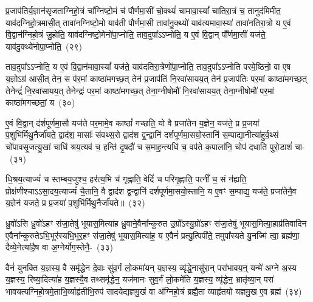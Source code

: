 {\anuvakamend[{वै मनः॒ स्फ्य इति॑ युन॒क्त्वेका॑\-दश च}]}

प्र॒जा\-प॑तिर्य॒ज्ञान॑सृजता\-ग्निहो॒त्रं चा᳚ग्निष्टो॒मं च॑ पौर्णमा॒सीं चो॒क्थ्यं॑ चामावा॒स्यां᳚ चातिरा॒त्रं च॒ तानुद॑मिमीत॒ याव॑दग्निहो॒त्रमासी॒त् तावा॑नग्निष्टो॒मो याव॑ती पौर्णमा॒सी तावा॑नु॒क्थ्यो॑ याव॑त्यमावा॒स्या॑ तावा॑नतिरा॒त्रो य ए॒वं वि॒द्वान॑ग्निहो॒त्रं जु॒होति॒ याव॑दग्निष्टो॒मेनो॑पा॒प्नोति॒ ताव॒दुपा᳚\-ऽऽ\-प्नोति॒ य ए॒वं वि॒द्वान् पौ᳚र्णमा॒सीं यज॑ते॒ याव॑दु॒क्थ्ये॑नो\-पा॒प्नोति॒~(२९)\ip

ताव॒दुपा᳚\-ऽऽ\-प्नोति॒ य ए॒वं वि॒द्वान॑मावा॒स्यां᳚ यज॑ते॒ याव॑दतिरा॒त्रेणो॑पा॒प्नोति॒ ताव॒दुपा᳚\-ऽऽ\-प्नोति परमे॒ष्ठिनो॒ वा ए॒ष य॒ज्ञो\-ऽग्र॑ आसी॒त् तेन॒ स प॑र॒मां काष्ठा॑मगच्छ॒त् तेन॑ प्र॒जा\-प॑तिं नि॒रवा॑सायय॒त् तेन॑ प्र॒जा\-प॑तिः पर॒मां काष्ठा॑मगच्छ॒त् तेनेन्द्रं॑ नि॒रवा॑सायय॒त् तेनेन्द्रः॑ पर॒मां काष्ठा॑मगच्छ॒त् तेना॒ग्नी\-षोमौ॑ नि॒रवा॑सायय॒त् तेना॒ग्नी\-षोमौ॑ पर॒मां काष्ठा॑मगच्छतां॒ य~(३०)\ip

ए॒वं वि॒द्वान् द॑र्\mbox{}शपूर्णमा॒सौ यज॑ते पर॒मामे॒व काष्ठां᳚ गच्छति॒ यो वै प्रजा॑तेन य॒ज्ञेन॒ यज॑ते॒ प्र प्र॒जया॑ प॒शुभि॑र्मिथु॒नैर्जा॑यते॒ द्वाद॑श॒ मासाः᳚ संवथ्स॒रो द्वाद॑श द्व॒न्द्वानि॑ दर्\mbox{}श\-पूर्ण\-मा॒सयो॒स्तानि॑ स॒म्पाद्या॒नीत्या॑हुर्व॒थ्सं चो॑पावसृ॒जत्यु॒खां चाधि॑ श्रय॒त्यव॑ च॒ हन्ति॑ दृ॒षदौ॑ च स॒माह॒न्त्यधि॑ च॒ वप॑ते क॒पाला॑नि॒ चोप॑ दधाति पुरो॒डाशं॑ चा-~(३१)\ip

धि॒श्रय॒त्याज्यं॑ च स्तम्बय॒जुश्च॒ हर॑त्य॒भि च॑ गृह्णाति॒ वेदिं॑ च परिगृ॒ह्णाति॒ पत्नीं᳚ च॒ सं न॑ह्यति॒ प्रोक्ष॑णीश्चा\-ऽऽ\-सा॒दय॒त्याज्यं॑ चै॒तानि॒ वै द्वाद॑श द्व॒न्द्वानि॑ दर्\mbox{}श\-पूर्ण\-मा॒सयो॒स्तानि॒ य ए॒वꣳ स॒म्पाद्य॒ यज॑ते॒ प्रजा॑तेनै॒व य॒ज्ञेन॑ यजते॒ प्र प्र॒जया॑ प॒शुभि॑र्मिथु॒नैर्जा॑यते॥~(३२)\ip

{\anuvakamend[{उ॒क्थ्ये॑नोपा॒प्नोत्य॑गच्छतां॒ यः पु॑रो॒डाशं॑ च चत्वारि॒ꣳ॒शच्च॑}]}

ध्रु॒वो॑\-ऽसि ध्रु॒वो॑\-ऽहꣳ स॑जा॒तेषु॑ भूयास॒मित्या॑ह ध्रु॒वाने॒वैना᳚न्कुरुत उ॒ग्रो᳚\-ऽस्यु॒ग्रो॑\-ऽहꣳ स॑जा॒तेषु॑ भूयास॒मित्या॒हाप्र॑तिवादिन ए॒वैना᳚न्कुरुते\-ऽभि॒भूर॑स्यभि॒भूर॒हꣳ स॑जा॒तेषु॑ भूयास॒मित्या॑ह॒ य ए॒वैनं॑ प्रत्यु॒त्पिपी॑ते॒ तमुपा᳚स्यते यु॒नज्मि॑ त्वा॒ ब्रह्म॑णा॒ दैव्ये॒नेत्या॑है॒ष वा अ॒ग्नेर्योग॒स्तेनै॒-~(३३)\ip

वैनं॑ युनक्ति य॒ज्ञस्य॒ वै समृ॑द्धेन दे॒वाः सु॑व॒र्गं लो॒कमा॑यन् य॒ज्ञस्य॒ व्यृ॑द्धे॒नासु॑रा॒न् परा॑भावय॒न्॒ यन्मे॑ अग्ने अ॒स्य य॒ज्ञस्य॒ रिष्या॒दित्या॑ह य॒ज्ञस्यै॒व तथ्समृ॑द्धेन॒ यज॑मानः सुव॒र्गं लो॒कमे॑ति य॒ज्ञस्य॒ व्यृ॑द्धेन॒ भ्रातृ॑व्या॒न् परा॑ भावयत्यग्नि\-हो॒त्रमे॒ताभि॒र्व्याहृ॑तीभि॒\-रुप॑ सादयेद्यज्ञमु॒खं वा अ॑ग्निहो॒त्रं ब्रह्मै॒ता व्याहृ॑तयो यज्ञमु॒ख ए॒व ब्रह्म॑~(३४)\ip

